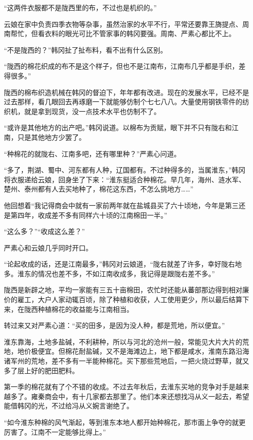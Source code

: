 “这两件衣服都不是陇西里的布，不过也是机织的。”

云娘在家中负责四季衣物等杂事，虽然治家的水平不行，平常还要靠王旖提点、周南帮忙，但看衣料的眼光可比不管家事的韩冈要强。周南、严素心都比不上。

“不是陇西的？”韩冈扯了扯布料，看不出有什么区别。

“陇西的棉花织成的布不是这个样子，但也不是江南布，江南布几乎都是手织，差得很多。”

陇西的棉布织造机械在韩冈的督迫下，年年都有改进。现在的发展水平，已经不是过去那样，看几眼回去再琢磨一下就能够仿制个七七八八。大量使用钢铁零件的纺织机，就是拿到现货，没一点技术水平也仿制不了。

“或许是其他地方的出产吧。”韩冈说道。以棉布为贡赋，眼下并不只有陇右和江南，只是其他地方少罢了。

“种棉花的就陇右、江南多吧，还有哪里种？”严素心问道。

“多了，荆湖、蜀中、河东都有人种，辽国都有。不过种得多的，当属淮东，”韩冈将衣服递给云娘，回身坐了下来：“淮东挺适合种棉花。早几年，海州、涟水军、楚州、泰州都有人去买地种了，棉花这东西，不怎么挑地方……”

他回想着“我记得商会中就有一家前两年就在盐城县买了六十顷地，今年是第三还是第四年，收成差不多有同样六十顷的江南棉田一半。”

“这么多？”“收成这么差？”

严素心和云娘几乎同时开口。

“论起收成的话，还是江南最多，”韩冈对云娘道，“陇右就差了许多，幸好陇右地多。淮东的情况也差不多，不如江南收成多，我记得是跟陇右差不多。”

陇西是新辟之地，平均一家能有三五十亩棉田，农忙时还能从蕃部那边得到相对廉价的雇工，大户人家动辄百顷，除了种植和收获，人工使用更少，所以最后结算下来，在陇西种植棉花的收益能与江南相当。

转过来又对严素心道：“买的田多，是因为没人种，都是荒地，所以便宜。”

淮东靠海，土地多盐碱，不利耕种，所以与河北的沧州一般，常能见大片大片的荒地，地价极便宜。但棉花耐盐碱，又不是海滩边上，地下都是咸水，淮南东路沿海诸军州的荒地，差不多有一半能种棉花。买下那些荒地后，一把火烧过野草，就又多了层上好的肥田肥料。

第一季的棉花就有了个不错的收成。不过去年秋后，去淮东买地的竞争对手是越来越多了。雍秦商会中，有十几家都去那里了。他们本来还想找冯从义一起去，希望能借韩冈的光，不过给冯从义婉言谢绝了。

“如今淮东种棉的风气渐起，等到淮东本地人都开始种棉花，那市面上争夺的就更厉害了。江南不一定能够比得上。”

